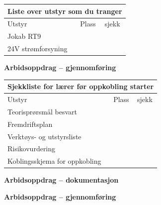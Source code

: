 \begin{center}
\begin{tabular}{ | m{8cm} | m{1cm}| m{2cm} | } 
\hline
\multicolumn{3}{|c|}{Liste over utstyr som du tranger} \\
\hline
Utstyr	& Plass & sjekk \\ 
\hline
\hline
	Jokab RT9 & & \\ 
	\hline
	24V strømforsyning &&\\
	
	\hline
\end{tabular}
\end{center}
\vskip 10pt 
\textbf{Arbidsoppdrag -- gjennomføring}

\begin{center}
\begin{tabular}{ | m{8cm} | m{1cm}| m{2cm} | } 
\hline
\multicolumn{3}{|c|}{Sjekkliste for lærer før oppkobling starter} \\
\hline
Utstyr	& Plass & sjekk \\ 
\hline
	Teorisprørsmål besvart &&\\
\hline
	Fremdriftsplan &&\\
\hline
	
	Verktøys- og utstyrsliste &&\\
\hline
	Risikovurdering &&\\ 	
	\hline
	Koblingsskjema for oppkobling &&\\
	\hline
\end{tabular}
\end{center}
\vskip 10pt 

\textbf{Arbidsoppdrag -- dokumentasjon}


\textbf{Arbidsoppdrag -- gjennomføring}

